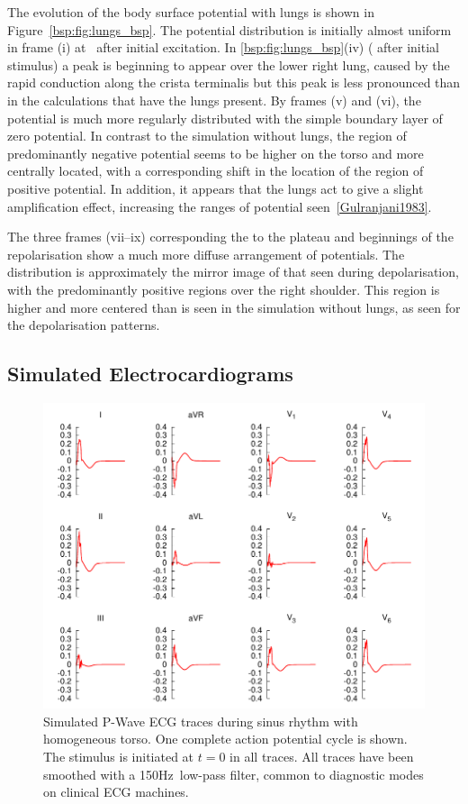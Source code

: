 The evolution of the body surface potential with lungs is shown in
Figure~\ref{bsp:fig:lungs_bsp}.
The potential distribution is initially almost uniform in frame (i) at
\ after initial excitation.
In \ref{bsp:fig:lungs_bsp}(iv) ( after initial stimulus) a peak is
beginning to appear over the lower right lung, caused by the rapid conduction
along the crista terminalis but this peak is less pronounced than in the
calculations that have the lungs present.
By frames (v) and (vi), the potential is much more regularly distributed with
the simple boundary layer of zero potential.
In contrast to the simulation without lungs, the region of predominantly negative potential seems
to be higher on the torso and more centrally located, with a corresponding shift
in the location of the region of positive potential.
In addition, it appears that the lungs act to give a slight amplification
effect, increasing the ranges of potential seen~\ref{Gulranjani1983}.

The three frames (vii--ix) corresponding the to the plateau and beginnings of the
repolarisation show a much more diffuse arrangement of potentials.
The distribution is approximately the mirror image of that seen during
depolarisation, with the predominantly positive regions over the right shoulder.
This region is higher and more centered than is seen in the simulation without
lungs, as seen for the depolarisation patterns.

\subsection{Simulated Electrocardiograms}
\begin{figure}
\includegraphics{figures/bsp/ecg_no_lungs_150Hz}
\caption[12 lead P-wave ECG during sinus rhythm with homogeneous torso]{
\label{bsp:fig:transp_lungs_ecg}
Simulated P-Wave ECG traces during sinus rhythm with homogeneous torso.
One complete action potential cycle is shown.
The stimulus is initiated at $t = 0$ in all traces.
All traces have been smoothed with a \unit{150}{Hz}\ low-pass filter, common to
diagnostic modes on clinical ECG machines.
}
\end{figure}

